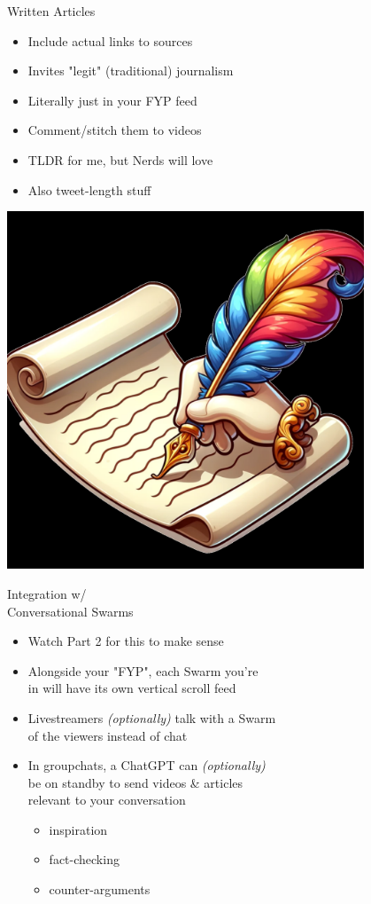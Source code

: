 \documentclass[aspectratio=35]{beamer} %
\begin{document}
\begin{frame}{Written Articles}
\vspace{-0.5in}
\begin{itemize}
    \item Include actual links to sources
    \item Invites "legit" (traditional) journalism
    \item Literally just in your FYP feed
    \item Comment/stitch them to videos
    \item TLDR for me, but Nerds will love
    \item Also tweet-length stuff
\end{itemize}
\centering
\includegraphics[width=0.8\textwidth]{imgs/media/quil.png}
\end{frame}

\begin{frame}{Integration w/\\Conversational Swarms}
\vspace{-1.1in}
\begin{itemize}
    \item Watch Part 2 for this to make sense
    \item Alongside your "FYP", each Swarm you're\\in will have its own vertical scroll feed
    \item Livestreamers \textit{(optionally)} talk with a Swarm\\of the viewers instead of chat
    \item In groupchats, a ChatGPT can \textit{(optionally)}\\be on standby to send videos \& articles\\relevant to your conversation
    \begin{itemize}
        \item inspiration
        \item fact-checking
        \item counter-arguments
    \end{itemize}
\end{itemize}
\end{frame}
\end{document}
